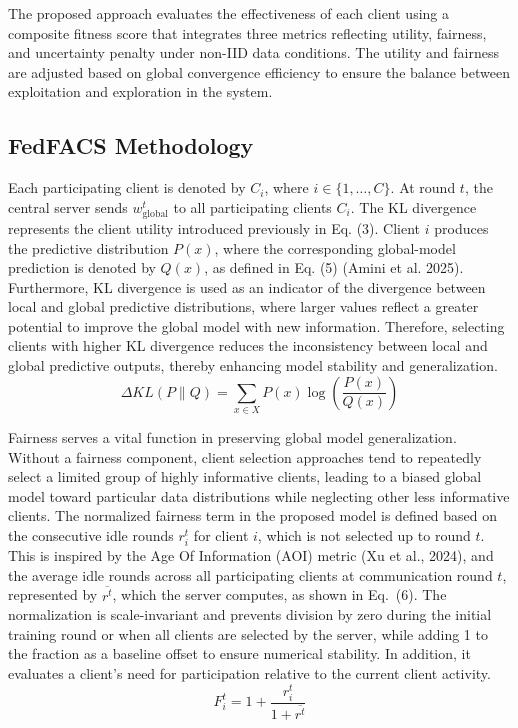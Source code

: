 \documentclass[pdflatex,sn-mathphys-num,oneside]{sn-jnl}%
\theoremstyle{thmstyleone}%
\theoremstyle{thmstyletwo}%
\theoremstyle{thmstylethree}%
\begin{document}
The proposed approach evaluates the effectiveness of each client using a composite fitness score that integrates three metrics reflecting utility, fairness, and uncertainty penalty under non-IID data conditions. The utility and fairness are adjusted based on global convergence efficiency to ensure the balance between exploitation and exploration in the system.

\subsection{FedFACS Methodology}
Each participating client is denoted by $C_i$, where $i \in \{1,\ldots,C\}$. At round $t$, the central server sends $w_{\text{global}}^t$ to all participating clients $C_i$. The KL divergence represents the client utility introduced previously in Eq. (3). Client $i$ produces the predictive distribution $P(x)$, where the corresponding global-model prediction is denoted by $Q(x)$, as defined in Eq. (5) (Amini et al. 2025). Furthermore, KL divergence is used as an indicator of the divergence between local and global predictive distributions, where larger values reflect a greater potential to improve the global model with new information. Therefore, selecting clients with higher KL divergence reduces the inconsistency between local and global predictive outputs, thereby enhancing model stability and generalization.
\begin{equation}
\Delta KL(P \parallel Q) = \sum_{x \in X} P(x)\log\left(\frac{P(x)}{Q(x)}\right)
\label{eq:kl}
\end{equation}

Fairness serves a vital function in preserving global model generalization. Without a fairness component, client selection approaches tend to repeatedly select a limited group of highly informative clients, leading to a biased global model toward particular data distributions while neglecting other less informative clients. The normalized fairness term in the proposed model is defined based on the consecutive idle rounds $r_i^t$ for client $i$, which is not selected up to round $t$. This is inspired by the Age Of Information (AOI) metric (Xu et al., 2024), and the average idle rounds across all participating clients at communication round $t$, represented by $\overline{r^t}$, which the server computes, as shown in Eq.~(6). The normalization is scale-invariant and prevents division by zero during the initial training round or when all clients are selected by the server, while adding 1 to the fraction as a baseline offset to ensure numerical stability. In addition, it evaluates a client’s need for participation relative to the current client activity.
\begin{equation}
F_i^t = 1 + \frac{r_i^t}{1 + \overline{r^t}}
\label{eq:fairness}
\end{equation}
\end{document}
